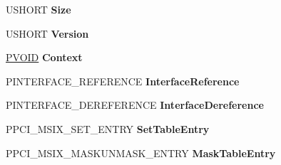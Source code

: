 \begin{DoxyCompactItemize}
\item 
\mbox{\label{struct___p_c_i___m_s_i_x___t_a_b_l_e___c_o_n_f_i_g___i_n_t_e_r_f_a_c_e_a49c26f3d1e37149cc8c337a622de6dd5}} 
U\+S\+H\+O\+RT {\bfseries Size}
\item 
\mbox{\label{struct___p_c_i___m_s_i_x___t_a_b_l_e___c_o_n_f_i_g___i_n_t_e_r_f_a_c_e_aca8996d7b7f79b7480f20f0e73051899}} 
U\+S\+H\+O\+RT {\bfseries Version}
\item 
\mbox{\label{struct___p_c_i___m_s_i_x___t_a_b_l_e___c_o_n_f_i_g___i_n_t_e_r_f_a_c_e_ae5122e589e9af2ca4a5fe254dd98125a}} 
\hyperlink{interfacevoid}{P\+V\+O\+ID} {\bfseries Context}
\item 
\mbox{\label{struct___p_c_i___m_s_i_x___t_a_b_l_e___c_o_n_f_i_g___i_n_t_e_r_f_a_c_e_adeb44a6a66177188a6a1476c218ad968}} 
P\+I\+N\+T\+E\+R\+F\+A\+C\+E\+\_\+\+R\+E\+F\+E\+R\+E\+N\+CE {\bfseries Interface\+Reference}
\item 
\mbox{\label{struct___p_c_i___m_s_i_x___t_a_b_l_e___c_o_n_f_i_g___i_n_t_e_r_f_a_c_e_add700b620e890c6e0f3023a975210318}} 
P\+I\+N\+T\+E\+R\+F\+A\+C\+E\+\_\+\+D\+E\+R\+E\+F\+E\+R\+E\+N\+CE {\bfseries Interface\+Dereference}
\item 
\mbox{\label{struct___p_c_i___m_s_i_x___t_a_b_l_e___c_o_n_f_i_g___i_n_t_e_r_f_a_c_e_ab6850c0599c36b5afd9d510cf5b2a2b3}} 
P\+P\+C\+I\+\_\+\+M\+S\+I\+X\+\_\+\+S\+E\+T\+\_\+\+E\+N\+T\+RY {\bfseries Set\+Table\+Entry}
\item 
\mbox{\label{struct___p_c_i___m_s_i_x___t_a_b_l_e___c_o_n_f_i_g___i_n_t_e_r_f_a_c_e_abf0e81d32c8c900e471ee771de22b9d5}} 
P\+P\+C\+I\+\_\+\+M\+S\+I\+X\+\_\+\+M\+A\+S\+K\+U\+N\+M\+A\+S\+K\+\_\+\+E\+N\+T\+RY {\bfseries Mask\+Table\+Entry}
\item 

\end{DoxyCompactItemize}
